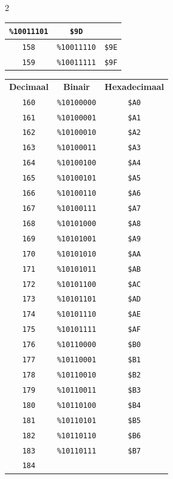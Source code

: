 \begin{multicols}{2}
\begin{center}
\begin{tabular}{|c|c|c|}
\texttt{\%10011101} &  \texttt{\$9D} \\ \hline \texttt{158} & \texttt{\%10011110} &  \texttt{\$9E} \\ \hline \texttt{159} & \texttt{\%10011111} &  \texttt{\$9F} \\ \hline
	\end{tabular}
\end{center}

\begin{center}
 \begin{tabular}{|c|c|c|}
  \hline
		\textbf{Decimaal} & \textbf{Binair} & \textbf{Hexadecimaal} \\ \hhline{|=|=|=|}    \texttt{160} & \texttt{\%10100000} &  \texttt{\$A0} \\ \hline \texttt{161} & \texttt{\%10100001} &  \texttt{\$A1} \\ \hline \texttt{162} & \texttt{\%10100010} &  \texttt{\$A2} \\ \hline \texttt{163} & \texttt{\%10100011} &  \texttt{\$A3} \\ \hline \texttt{164} & \texttt{\%10100100} &  \texttt{\$A4} \\ \hline \texttt{165} & \texttt{\%10100101} &  \texttt{\$A5} \\ \hline \texttt{166} & \texttt{\%10100110} &  \texttt{\$A6} \\ \hline \texttt{167} & \texttt{\%10100111} &  \texttt{\$A7} \\ \hline \texttt{168} & \texttt{\%10101000} &  \texttt{\$A8} \\ \hline \texttt{169} & \texttt{\%10101001} &  \texttt{\$A9} \\ \hline \texttt{170} & \texttt{\%10101010} &  \texttt{\$AA} \\ \hline \texttt{171} & \texttt{\%10101011} &  \texttt{\$AB} \\ \hline \texttt{172} & \texttt{\%10101100} &  \texttt{\$AC} \\ \hline \texttt{173} & \texttt{\%10101101} &  \texttt{\$AD} \\ \hline \texttt{174} & \texttt{\%10101110} &  \texttt{\$AE} \\ \hline \texttt{175} & \texttt{\%10101111} &  \texttt{\$AF} \\ \hline \texttt{176} & \texttt{\%10110000} &  \texttt{\$B0} \\ \hline \texttt{177} & \texttt{\%10110001} &  \texttt{\$B1} \\ \hline \texttt{178} & \texttt{\%10110010} &  \texttt{\$B2} \\ \hline \texttt{179} & \texttt{\%10110011} &  \texttt{\$B3} \\ \hline \texttt{180} & \texttt{\%10110100} &  \texttt{\$B4} \\ \hline \texttt{181} & \texttt{\%10110101} &  \texttt{\$B5} \\ \hline \texttt{182} & \texttt{\%10110110} &  \texttt{\$B6} \\ \hline \texttt{183} & \texttt{\%10110111} &  \texttt{\$B7} \\ \hline \texttt{184} & 
\end{tabular}
\end{center}
\end{multicols}
